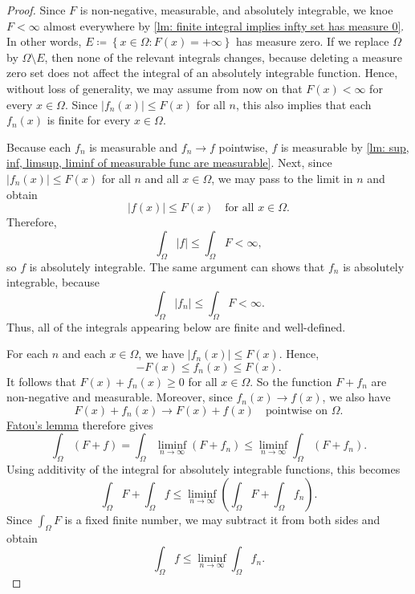 \begin{proof}
    Since \(F\) is non-negative, measurable, and absolutely integrable, we knoe \(F < \infty\) almost everywhere by \autoref{lm: finite integral implies infty set has measure 0}. In other words, \(E \coloneqq \left\{ x \in \Omega: F(x) = + \infty \right\} \) has measure zero. If we replace \(\Omega\) by \(\Omega \setminus E\), then none of the relevant integrals changes, because deleting a measure zero set does not affect the integral of an absolutely integrable function. Hence, without loss of generality, we may assume from now on that \(F(x) < \infty\) for every \(x \in \Omega\). Since \(\vert f_n(x) \vert \le F(x) \) for all \(n\), this also implies that each \(f_n(x)\) is finite for every \(x \in \Omega\). 

    Because each \(f_n\) is measurable and \(f_n \to f\) pointwise, \(f\) is measurable by \autoref{lm: sup, inf, limsup, liminf of measurable func are measurable}. Next, since \(\vert f_n(x) \vert \le F(x) \) for all \(n\) and all \(x \in \Omega\), we may pass to the limit in \(n\) and obtain 
    \[
        \vert f(x) \vert \le F(x) \quad \text{for all } x \in \Omega.   
    \]                  
    Therefore,
    \[
        \int _\Omega \vert f \vert \le \int _\Omega F < \infty, 
    \]
    so \(f\) is absolutely integrable. The same argument can shows that \(f_n\) is absolutely integrable, because 
    \[
        \int _\Omega \vert f_n \vert \le \int _\Omega F < \infty. 
    \] 
    Thus, all of the integrals appearing below are finite and well-defined.

    For each \(n\) and each \(x \in \Omega\), we have \(\vert f_n(x) \vert \le F(x) \). Hence, 
    \[
        -F(x) \le f_n(x) \le F(x).
    \]   
    It follows that \(F(x) + f_n(x) \ge 0\) for all \(x \in \Omega\). So the function \(F + f_n\) are non-negative and measurable. Moreover, since \(f_n(x) \to f(x)\), we also have 
    \[
        F(x) + f_n(x) \to F(x) + f(x) \quad \text{pointwise on } \Omega. 
    \]    
    \hyperref[lm: Fatou]{Fatou's lemma} therefore gives
    \[
        \int _\Omega (F + f) = \int _\Omega \liminf_{n \to \infty} (F + f_n) \le \liminf_{n \to \infty} \int _\Omega (F + f_n). 
    \] 
    Using additivity of the integral for absolutely integrable functions, this becomes
    \[
        \int _\Omega F + \int _\Omega f \le \liminf_{n \to \infty} \left( \int _\Omega F + \int _\Omega f_n \right).  
    \]
    Since \(\int _\Omega F\) is a fixed finite number, we may subtract it from both sides and obtain 
    \[
        \int _\Omega f \le \liminf_{n \to \infty} \int _\Omega f_n. 
    \] 


\end{proof}
